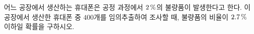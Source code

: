 어느 공장에서 생산하는 휴대폰은 공정 과정에서 $2\mkern3mu \%$의 불량품이 발생한다고 한다. 이 공장에서 생산한 휴대폰 중 $400$개를 임의추출하여 조사할 때, 불량품의 비율이 $2.7\mkern3mu \%$ 이하일 확률을 구하시오. 
